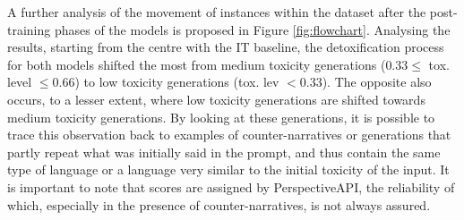 A further analysis of the movement of instances within the dataset after the post-training phases of the models is proposed in Figure \ref{fig:flowchart}. Analysing the results, starting from the centre with the IT baseline, the detoxification process for both models shifted the most from medium toxicity generations ($0.33 \leq$ tox. level $\leq 0.66$) to low toxicity generations (tox. lev $< 0.33$). The opposite also occurs, to a lesser extent, where low toxicity generations are shifted towards medium toxicity generations. By looking at these generations, it is possible to trace this observation back to examples of counter-narratives or generations that partly repeat what was initially said in the prompt, and thus contain the same type of language or a language very similar to the initial toxicity of the input. It is important to note that scores are assigned by PerspectiveAPI, the reliability of which, especially in the presence of counter-narratives, is not always assured.


